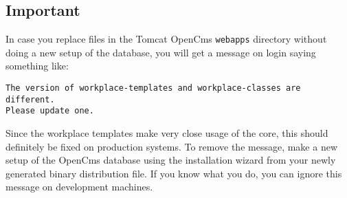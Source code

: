 \subsection{Important}

In case you replace files in the Tomcat OpenCms \texttt{webapps} directory without doing a new setup of the database, you will get a message on login saying something like: 

\texttt{The version of workplace-templates and workplace-classes are different.\\Please update one.}

Since the workplace templates make very close usage of the core, this should 
definitely be fixed on production systems. To remove the message, make a new 
setup of the OpenCms database using the installation wizard from your newly 
generated binary distribution file. If you know what you do, you can ignore 
this message on development machines. 
